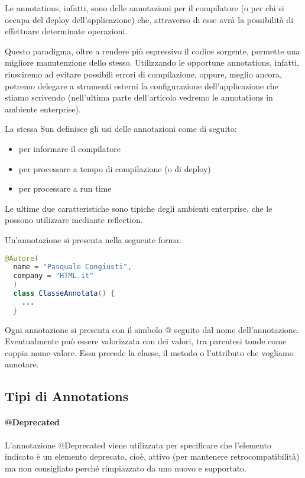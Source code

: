 \documentclass[a4paper,12pt,twoside]{book}
\begin{document}
Le annotations, infatti, sono delle annotazioni per il compilatore (o
per chi si occupa del deploy dell'applicazione) che, attraverso di
esse avrà la possibilità di effettuare determinate operazioni.

Questo paradigma, oltre a rendere più espressivo il codice sorgente,
permette una migliore manutenzione dello stesso. Utilizzando le
opportune annotations, infatti, riusciremo ad evitare possibili errori
di compilazione, oppure, meglio ancora, potremo delegare a strumenti
esterni la configurazione dell'applicazione che stiamo scrivendo
(nell'ultima parte dell'articolo vedremo le annotations in ambiente
enterprise).

La stessa Sun definisce gli usi delle annotazioni come di seguito:

\begin{itemize}
\item per informare il compilatore
\item per processare a tempo di compilazione (o di deploy)
\item per processare a run time
\end{itemize}

Le ultime due caratteristiche sono tipiche degli ambienti enterprise,
che le possono utilizzare mediante reflection.


Un'annotazione si presenta nella seguente forma:

\begin{lstlisting}[caption={In questo esempio abbiamo annotato la classe con l'annotation Autore
    ed i due attributi name e company.}, label={lst:annotations}, language=Java]
  @Autore(
  name = "Pasquale Congiusti",
  company = "HTML.it"
  )
  class ClasseAnnotata() {
    ...
  }
\end{lstlisting}
Ogni annotazione si presenta con il simbolo @ seguito dal nome
dell'annotazione. Eventualmente può essere valorizzata con dei valori,
tra parentesi tonde come coppia nome-valore. Essa precede la classe,
il metodo o l'attributo che vogliamo annotare.

\subsection{Tipi di Annotations}

\paragraph{@Deprecated} 
L'annotazione @Deprecated viene utilizzata per specificare che
l'elemento indicato è un elemento deprecato, cioè, attivo (per
mantenere retrocompatibilità) ma non consigliato perché rimpiazzato da
uno nuovo e supportato.
\end{document}
